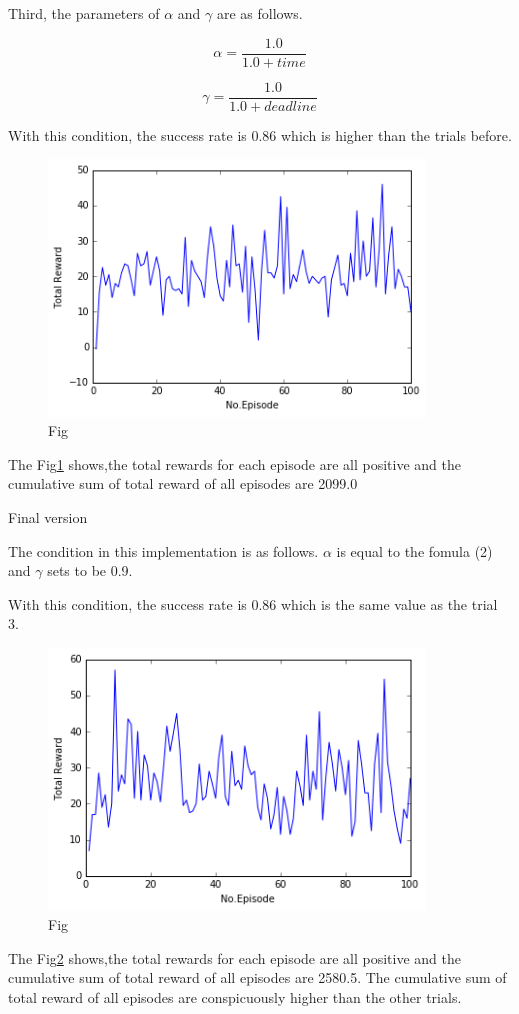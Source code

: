 \documentclass[a4paper,11pt]{article}
\begin{document}
Third, the parameters of $\alpha$ and $\gamma$ are as follows.

\begin{equation}
	\alpha=\frac{1.0}{1.0+time}
\end{equation}

\begin{equation}
	\gamma=\frac{1.0}{1.0+deadline}
\end{equation}

With this condition, the success rate is 0.86 which is higher than the trials before.


\begin{figure}[H]
\begin{center}
\includegraphics[width=100mm]{graph/better.jpg}
\end{center}
\caption{Fig}
\label{fig:three}
\end{figure}

The Fig\ref{fig:three} shows,the total rewards for each episode are all positive and the cumulative sum of total reward of all episodes are 2099.0


Final version

The condition in this implementation is as follows.
$\alpha$ is equal to the fomula (2) and $\gamma$ sets to be 0.9.

With this condition, the success rate is 0.86 which is the same value as the trial 3.

\begin{figure}[H]
\begin{center}
\includegraphics[width=100mm]{graph/gamma_con.jpg}
\end{center}
\caption{Fig}
\label{fig:four}
\end{figure}

The Fig\ref{fig:four} shows,the total rewards for each episode are all positive and the cumulative sum of total reward of all episodes are 2580.5.
The cumulative sum of total reward of all episodes are conspicuously higher than the other trials. 
\end{document}
